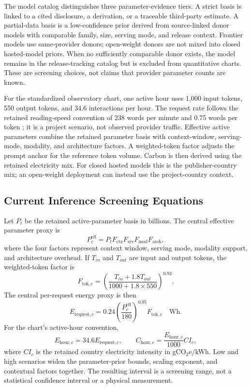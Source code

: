 \documentclass[11pt,a4paper]{article}
\begin{document}
The model catalog distinguishes three parameter-evidence tiers. A strict basis is linked to a cited disclosure, a derivation, or a traceable third-party estimate. A partial-data basis is a low-confidence prior derived from source-linked donor models with comparable family, size, serving mode, and release context. Frontier models use same-provider donors; open-weight donors are not mixed into closed hosted-model priors. When no sufficiently comparable donor exists, the model remains in the release-tracking catalog but is excluded from quantitative charts. These are screening choices, not claims that provider parameter counts are known.

For the standardized observatory chart, one active hour uses 1,000 input tokens, 550 output tokens, and 34.6 interactions per hour. The request rate follows the retained reading-speed convention of 238 words per minute and 0.75 words per token \cite{brysbaert2019}; it is a project scenario, not observed provider traffic. Effective active parameters combine the retained parameter basis with context-window, serving-mode, modality, and architecture factors. A weighted-token factor adjusts the prompt anchor for the reference token volume. Carbon is then derived using the retained electricity mix. For closed hosted models this is the publisher-country mix; an open-weight deployment can instead use the project-country context.

\subsection{Current Inference Screening Equations}
Let $P_t$ be the retained active-parameter basis in billions. The central effective parameter proxy is
\begin{equation}
P^{\mathrm{eff}}_c = P_t F_{\mathrm{ctx}}F_{\mathrm{srv}}F_{\mathrm{mod}}F_{\mathrm{arch}},
\end{equation}
where the four factors represent context window, serving mode, modality support, and architecture overhead. If $T_{in}$ and $T_{out}$ are input and output tokens, the weighted-token factor is
\begin{equation}
F_{\mathrm{tok},c}=\left(\frac{T_{in}+1.8T_{out}}{1000+1.8\times550}\right)^{0.92}.
\end{equation}
The central per-request energy proxy is then
\begin{equation}
E_{\mathrm{request},c}=0.24\left(\frac{P^{\mathrm{eff}}_c}{180}\right)^{0.95}F_{\mathrm{tok},c}\quad\mathrm{Wh}.
\end{equation}
For the chart's active-hour convention,
\begin{equation}
E_{\mathrm{hour},c}=34.6E_{\mathrm{request},c},\qquad
C_{\mathrm{hour},c}=\frac{E_{\mathrm{hour},c}}{1000}CI_c,
\end{equation}
where $CI_c$ is the retained country electricity intensity in gCO$_2$e/kWh. Low and high scenarios widen the parameter-prior bounds, scaling exponent, and contextual factors together. The resulting interval is a screening range, not a statistical confidence interval or a physical measurement.
\end{document}
